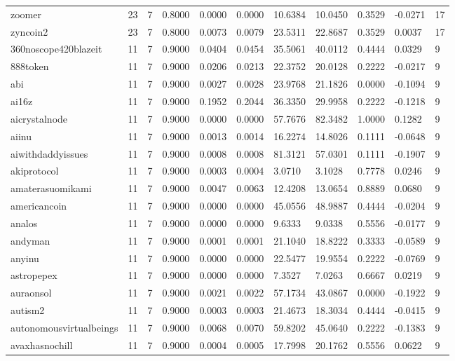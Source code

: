 \begin{table}[htbp]
\begin{tabular}{lllllllllll}
zoomer & 23 & 7 & 0.8000 & 0.0000 & 0.0000 & 10.6384 & 10.0450 & 0.3529 & -0.0271 & 17 \\
zyncoin2 & 23 & 7 & 0.8000 & 0.0073 & 0.0079 & 23.5311 & 22.8687 & 0.3529 & 0.0037 & 17 \\
360noscope420blazeit & 11 & 7 & 0.9000 & 0.0404 & 0.0454 & 35.5061 & 40.0112 & 0.4444 & 0.0329 & 9 \\
888token & 11 & 7 & 0.9000 & 0.0206 & 0.0213 & 22.3752 & 20.0128 & 0.2222 & -0.0217 & 9 \\
abi & 11 & 7 & 0.9000 & 0.0027 & 0.0028 & 23.9768 & 21.1826 & 0.0000 & -0.1094 & 9 \\
ai16z & 11 & 7 & 0.9000 & 0.1952 & 0.2044 & 36.3350 & 29.9958 & 0.2222 & -0.1218 & 9 \\
aicrystalnode & 11 & 7 & 0.9000 & 0.0000 & 0.0000 & 57.7676 & 82.3482 & 1.0000 & 0.1282 & 9 \\
aiinu & 11 & 7 & 0.9000 & 0.0013 & 0.0014 & 16.2274 & 14.8026 & 0.1111 & -0.0648 & 9 \\
aiwithdaddyissues & 11 & 7 & 0.9000 & 0.0008 & 0.0008 & 81.3121 & 57.0301 & 0.1111 & -0.1907 & 9 \\
akiprotocol & 11 & 7 & 0.9000 & 0.0003 & 0.0004 & 3.0710 & 3.1028 & 0.7778 & 0.0246 & 9 \\
amaterasuomikami & 11 & 7 & 0.9000 & 0.0047 & 0.0063 & 12.4208 & 13.0654 & 0.8889 & 0.0680 & 9 \\
americancoin & 11 & 7 & 0.9000 & 0.0000 & 0.0000 & 45.0556 & 48.9887 & 0.4444 & -0.0204 & 9 \\
analos & 11 & 7 & 0.9000 & 0.0000 & 0.0000 & 9.6333 & 9.0338 & 0.5556 & -0.0177 & 9 \\
andyman & 11 & 7 & 0.9000 & 0.0001 & 0.0001 & 21.1040 & 18.8222 & 0.3333 & -0.0589 & 9 \\
anyinu & 11 & 7 & 0.9000 & 0.0000 & 0.0000 & 22.5477 & 19.9554 & 0.2222 & -0.0769 & 9 \\
astropepex & 11 & 7 & 0.9000 & 0.0000 & 0.0000 & 7.3527 & 7.0263 & 0.6667 & 0.0219 & 9 \\
auraonsol & 11 & 7 & 0.9000 & 0.0021 & 0.0022 & 57.1734 & 43.0867 & 0.0000 & -0.1922 & 9 \\
autism2 & 11 & 7 & 0.9000 & 0.0003 & 0.0003 & 21.4673 & 18.3034 & 0.4444 & -0.0415 & 9 \\
autonomousvirtualbeings & 11 & 7 & 0.9000 & 0.0068 & 0.0070 & 59.8202 & 45.0640 & 0.2222 & -0.1383 & 9 \\
avaxhasnochill & 11 & 7 & 0.9000 & 0.0004 & 0.0005 & 17.7998 & 20.1762 & 0.5556 & 0.0622 & 9 \\

\end{tabular}
\end{table}

